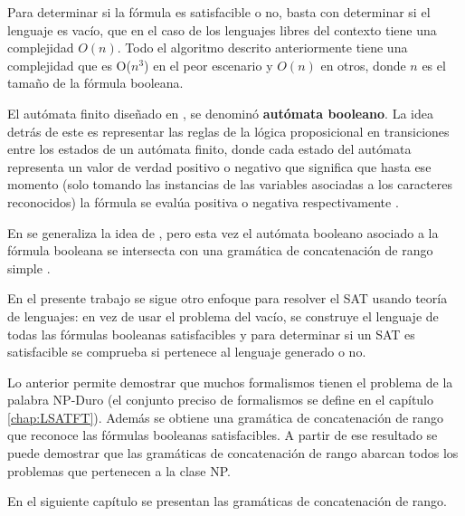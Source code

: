 \documentclass[12pt]{article}
\begin{document}
Para determinar si la fórmula es satisfacible o no, basta con determinar si el lenguaje es vacío, que en el caso de los lenguajes libres del contexto tiene una complejidad $O(n)$. Todo el algoritmo descrito anteriormente tiene una complejidad que es O($n^3$) en el peor escenario y $O(n)$ en otros, donde $n$ es el tamaño de la fórmula booleana.

El autómata finito diseñado en \cite{aCFSAT}, se denominó \textbf{autómata booleano}. La idea detrás de este es 
representar las reglas de la lógica proposicional en transiciones entre los estados de un autómata finito, 
donde cada estado del autómata representa un valor de verdad positivo o negativo que significa que hasta ese 
momento (solo tomando las instancias de las variables asociadas a los caracteres reconocidos) la fórmula se 
evalúa positiva o negativa respectivamente \cite{aCFSAT}.

En \cite{aSRCSAT} se generaliza la idea de \cite{aCFSAT}, pero esta vez el autómata booleano asociado a la fórmula booleana se intersecta con una gramática de concatenación de rango simple \cite{mainRCGBib}.

En el presente trabajo se sigue otro enfoque para resolver el SAT usando teoría de lenguajes: en vez de usar el 
problema del vacío, se construye el lenguaje de todas las fórmulas booleanas satisfacibles y para determinar 
si un SAT es satisfacible se comprueba si pertenece al lenguaje generado o no. 

Lo anterior permite demostrar que muchos formalismos tienen el problema de la palabra NP-Duro 
(el conjunto preciso de formalismos se define en el capítulo \ref{chap:LSATFT}). 
Además se obtiene una gramática de concatenación de rango que reconoce las fórmulas booleanas 
satisfacibles. A partir de ese resultado se puede demostrar que las gramáticas de concatenación de rango 
abarcan todos los problemas que pertenecen a la clase NP.

En el siguiente capítulo se presentan las gramáticas de concatenación de rango.
\end{document}
